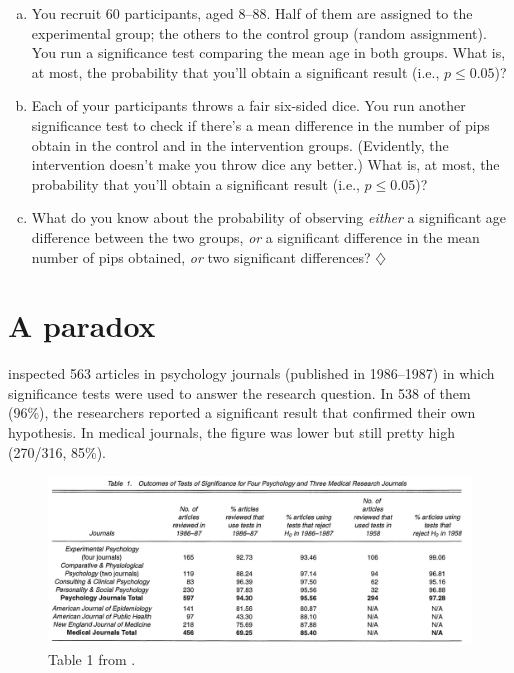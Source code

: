 \documentclass[a4paper]{tufte-book}\usepackage[]{graphicx}\usepackage[]{xcolor}
\newcommand*{\parend}[1][$\diamondsuit$]{%
\leavevmode\unskip\penalty9999 \hbox{}\nobreak\hfill
    \quad\hbox{#1}%
}
\begin{document}
\begin{enumerate}[(a)]
  \item You recruit 60 participants, aged 8--88. Half of them
  are assigned to the experimental group; the others to the
  control group (random assignment). You run a significance test
  comparing the mean age in both groups. What is, at most, the probability
  that you'll obtain a significant result (i.e., $p \leq 0.05$)?
  
  \item Each of your participants throws a fair six-sided dice.
  You run another significance test to check if there's a mean
  difference in the number of pips obtain in the control and in
  the intervention groups. (Evidently, the intervention doesn't
  make you throw dice any better.)
  What is, at most, the probability
  that you'll obtain a significant result (i.e., $p \leq 0.05$)?
  
  \item What do you know about the probability of observing
  \emph{either} a significant age difference between the two groups,
  \emph{or} a significant difference in the mean number of pips obtained,
  \emph{or} two significant differences? \parend
\end{enumerate}

\section{A paradox}
\citet{Sterling1995} inspected 563 articles in psychology
journals (published in 1986--1987) in which significance tests
were used to answer the research question.
In 538 of them (96\%), the researchers reported a significant
result that confirmed their own hypothesis.
In medical journals, the figure was lower but still pretty high
(270/316, 85\%).

\begin{figure}
\centering
\includegraphics[width=\textwidth]{figure/Sterling1995}
\caption{Table 1 from \citet{Sterling1995}.}
\label{fig:sterling}
\end{figure}
\end{document}
